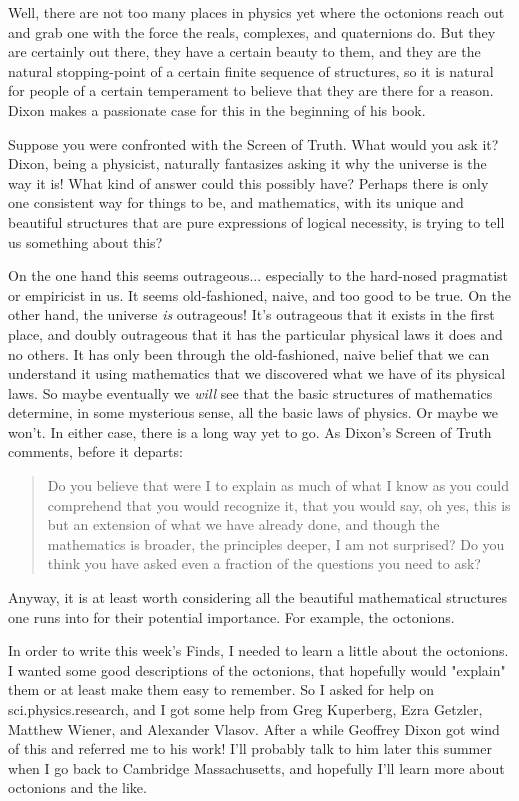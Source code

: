 Well, there are not too many places in physics yet
where the octonions reach out and grab one with the force 
the reals, complexes, and quaternions do.  But they are
certainly out there, they have a certain beauty to them,
and they are the natural stopping-point of a certain finite
sequence of structures, so it is natural for people
of a certain temperament to believe that they are there for a
reason.  Dixon makes a passionate case for this in the beginning
of his book.  

Suppose you were confronted with the Screen of Truth.  
What would you ask it?  Dixon, being a physicist,
naturally fantasizes asking it why the universe is the way it
is!  What kind of answer could this possibly have?  Perhaps
there is only one consistent way for things to be, and mathematics,
with its unique and beautiful structures that are pure expressions
of logical necessity, is trying to tell us something about this?  

On the one hand this seems outrageous... especially to the 
hard-nosed pragmatist or empiricist in us.  It seems 
old-fashioned, naive, and too good to be true.  On the other hand, the
universe \emph{is} outrageous!  It's outrageous that it exists in the
first place, and doubly outrageous that it has the particular
physical laws it does and no others.  It has only been through
the old-fashioned, naive belief that we can understand it using
mathematics that we discovered what we have of its physical laws.  
So maybe eventually we \emph{will} see that the basic structures of
mathematics determine, in some mysterious sense, all the basic
laws of physics.  Or maybe we won't.  In either case, there is
a long way yet to go.  As Dixon's Screen of Truth comments, before
it departs:

\begin{quote}
  Do you believe that were I to explain as much of what I know
  as you could comprehend that you would recognize it, that you 
  would say, oh yes, this is but an extension of what we have  
  already done, and though the mathematics is broader, the principles
  deeper, I am not surprised?  Do you think you have asked even a
  fraction of the questions you need to ask?
\end{quote}

Anyway, it is at least worth considering all the beautiful mathematical
structures one runs into for their potential importance.  For example,
the octonions.  

In order to write this week's Finds, I needed to learn a little about
the octonions.  I wanted some good descriptions of the octonions, 
that hopefully would "explain" them or at least make them easy
to remember.  So I asked for help on sci.physics.research, and I
got some help from Greg Kuperberg, Ezra Getzler, Matthew Wiener,
and Alexander Vlasov.  After a while Geoffrey Dixon got wind of this
and referred me to his work!  I'll probably talk to him later this
summer when I go back to Cambridge Massachusetts, and hopefully
I'll learn more about octonions and the like.  

